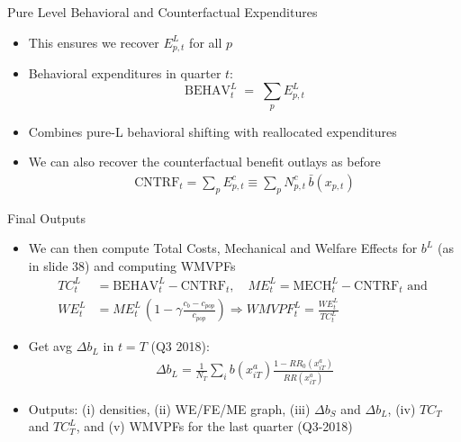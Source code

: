 \begin{frame}{Pure Level Behavioral and Counterfactual Expenditures}
    \begin{itemize}
        \item {This ensures we recover $E^{L}_{p,t}$ for all $p$}

        \item Behavioral expenditures in quarter $t$:
        \[
            {
            \text{BEHAV}^{L}_t
            \;=\;
            \sum_{p}
            E^{L}_{p,t}
            }
        \]

        \item {Combines pure-L behavioral shifting with reallocated expenditures}

        \item We can also recover the counterfactual benefit outlays as before
        \begin{align*}
            {
            \text{CNTRF}_t
            =
            \sum_{p}
            E^{c}_{p,t}
            }\equiv \sum_{p}
            N^{c}_{p,t}\,
            \bar b(x_{p,t})
        \end{align*}
    \end{itemize}
\end{frame}



\begin{frame}{Final Outputs}
    \begin{itemize}
        \item We can then compute Total Costs, Mechanical and Welfare Effects for $b^L$ (as in slide 38) and computing WMVPFs
        \begin{align*}
             TC^L_t &= \text{BEHAV}_t^{L} - \text{CNTRF}_t, \quad
             ME^L_t = \text{MECH}_t^{L} - \text{CNTRF}_t \text{ and }\\
            WE^L_t &= ME^L_t \, \left(1-\gamma \frac{c_b - c_{pop}}{c_{pop}}\right) \Rightarrow WMVPF_t^L = \frac{WE^L_t}{TC^L_t}
        \end{align*}

        \item Get avg $\Delta b_L$ in $t=T$ (Q3 2018):
        \begin{align*}
            \Delta b_L = \frac{1}{N_T}\sum_{i}b(x^a_{iT})\frac{1-RR_{0}(x^a_{iT})}{RR(x^a_{iT})}
        \end{align*}

        \item Outputs: (i) densities, (ii) WE/FE/ME graph, (iii) $\Delta b_S$ and $\Delta b_L$, (iv) $TC_T$ and $TC_T^L$, and (v) WMVPFs for the last quarter (Q3-2018)
    \end{itemize}
\end{frame}

